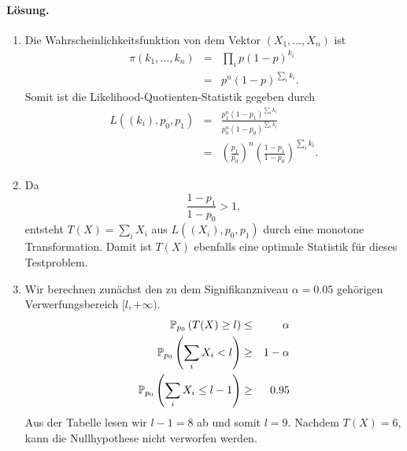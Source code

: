 \paragraph*{Lösung.}
\begin{enumerate}
    \item Die Wahrscheinlichkeitsfunktion von dem Vektor $\left( X_1, \ldots, X_n \right)$ ist
        \begin{eqnarray*}
            \pi\left( k_1, \ldots, k_n \right) &=& \prod_i p(1-p)^{k_i} \\
            &=& p^n (1-p)^{\sum_{i}^{} k_i}.
        \end{eqnarray*}
        Somit ist die Likelihood-Quotienten-Statistik gegeben durch
        \begin{eqnarray*}
            L( (k_i), p_0, p_1) &=& \frac{p_1^n (1-p_1)^{\sum_{i} k_i}}{ p_0^n (1-p_0)^{\sum_{i} k_i}} \\
            &=& \left( \frac{p_1}{p_0} \right)^n \left( \frac{1-p_1}{1-p_0} \right)^{\sum_{i} k_i}.
        \end{eqnarray*}
    \item Da 
        \begin{equation*}
            \frac{1-p_1}{1-p_0} > 1,
        \end{equation*}
        entsteht $T(X) = \sum_{i}^{} X_i$ aus $L( (X_i), p_0, p_1 )$ durch eine monotone Transformation.
        Damit ist $T(X)$ ebenfalls eine optimale Statistik für dieses Testproblem.
    \item Wir berechnen zunächst den zu dem Signifikanzniveau $\alpha=0.05$ gehörigen Verwerfungsbereich
        $[l, +\infty)$. 
        \begin{eqnarray*}
            \mathbb P_{p_0} \left( T(X) \geq l \right) & \leq & \alpha \\
            \mathbb P_{p_0} \left( \sum_{i}^{} X_i < l \right) & \geq & 1-\alpha \\ 
            \mathbb P_{p_0} \left( \sum_{i}^{} X_i \leq l-1 \right) & \geq & 0.95 \\ 
        \end{eqnarray*}
        Aus der Tabelle lesen wir $l-1=8$ ab und somit $l=9$. Nachdem $T(X)=6$, kann die Nullhypothese
        nicht verworfen werden.
\end{enumerate}







